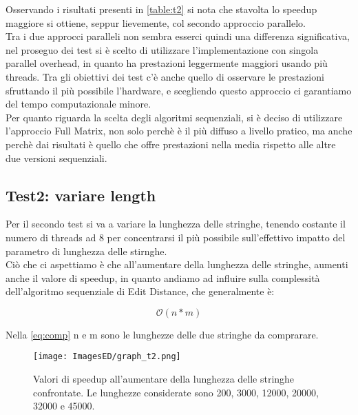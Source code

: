 \documentclass[10pt,twocolumn,letterpaper]{article}
\begin{document}
Osservando i risultati presenti in \cref{table:t2} si nota che stavolta lo speedup maggiore si ottiene, seppur lievemente, col secondo approccio parallelo.\\
Tra i due approcci paralleli non sembra esserci quindi una differenza significativa, nel proseguo dei test si è scelto di utilizzare l'implementazione con singola parallel overhead, in quanto ha prestazioni leggermente maggiori usando più threads. Tra gli obiettivi dei test c'è anche quello di osservare le prestazioni sfruttando il più possibile l'hardware, e scegliendo questo approccio ci garantiamo del tempo computazionale minore.\\
Per quanto riguarda la scelta degli algoritmi sequenziali, si è deciso di utilizzare l'approccio Full Matrix, non solo perchè è il più diffuso a livello pratico, ma anche perchè dai risultati è quello che offre prestazioni nella media rispetto alle altre due versioni sequenziali.

\subsection{Test2: variare length}
\label{sec:t2}
Per il secondo test si va a variare la lunghezza delle stringhe, tenendo costante il numero di threads ad 8 per concentrarsi il più possibile sull'effettivo impatto del parametro di lunghezza delle stirnghe.\\
Ciò che ci aspettiamo è che all'aumentare della lunghezza delle stringhe, aumenti anche il valore di speedup, in quanto andiamo ad influire sulla complessità dell'algoritmo sequenziale di Edit Distance, che generalmente è:

\begin{equation}
    \label{eq:comp}
    \mathcal{O}(n * m)
\end{equation}

Nella \cref{eq:comp} n e m sono le lunghezze delle due stringhe da comprarare.

\begin{figure}[h]
    \centering
    \texttt{[image: ImagesED/graph\_t2.png]}
    \caption{Valori di speedup all'aumentare della lunghezza delle stringhe confrontate. Le lunghezze considerate sono 200, 3000, 12000, 20000, 32000 e 45000.}
    \label{fig:t2}
\end{figure}
\end{document}
